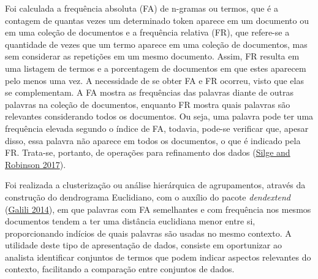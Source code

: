 \documentclass[preprint, 3p,
authoryear]{elsarticle} %
\begin{document}
Foi calculada a frequência absoluta (FA) de n-gramas ou termos, que é a
contagem de quantas vezes um determinado token aparece em um documento
ou em uma coleção de documentos e a frequência relativa (FR), que
refere-se a quantidade de vezes que um termo aparece em uma coleção de
documentos, mas sem considerar as repetições em um mesmo documento.
Assim, FR resulta em uma listagem de termos e a porcentagem de
documentos em que estes aparecem pelo menos uma vez. A necessidade de se
obter FA e FR ocorreu, visto que elas se complementam. A FA mostra as
frequências das palavras diante de outras palavras na coleção de
documentos, enquanto FR mostra quais palavras são relevantes
considerando todos os documentos. Ou seja, uma palavra pode ter uma
frequência elevada segundo o índice de FA, todavia, pode-se verificar
que, apesar disso, essa palavra não aparece em todos os documentos, o
que é indicado pela FR. Trata-se, portanto, de operações para
refinamento dos dados (\protect\hyperlink{ref-Silge2017}{Silge and
Robinson 2017}).

Foi realizada a clusterização ou análise hierárquica de agrupamentos,
através da construção do dendrograma Euclidiano, com o auxílio do pacote
\emph{dendextend} (\protect\hyperlink{ref-galili2014dendextend}{Galili
2014}), em que palavras com FA semelhantes e com frequência nos mesmos
documentos tendem a ter uma distância euclidiana menor entre si,
proporcionando indícios de quais palavras são usadas no mesmo contexto.
A utilidade deste tipo de apresentação de dados, consiste em oportunizar
ao analista identificar conjuntos de termos que podem indicar aspectos
relevantes do contexto, facilitando a comparação entre conjuntos de
dados.
\end{document}
